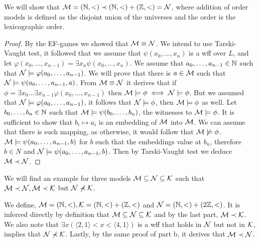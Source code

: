 \subquestion{}
We will show that $\mathcal{M} = (\mathbb{N}, <) \prec (\mathbb{N}, <) + (\mathbb{Z}, <) = \mathcal{N}$, where addition of order models is defined as the disjoint union of the universes and the order is the lexicographic order.
\begin{proof}
	By the EF-games we showed that $\mathcal{M} \equiv \mathcal{N}$.
	We intend to use Tarski-Vaught test, it followed that we assume that $\psi(x_0, \dots, x_n)$ is a wff over $L$,
	and let $\varphi(x_0, \dots, x_{n - 1}) = \exists x_n \psi(x_0, \dots, x_n)$.
	We assume that $a_0, \dots, a_{n - 1} \in \mathbb{N}$ such that $\mathcal{N} \models \varphi(a_0, \dots, a_{n - 1})$.
	We will prove that there is $a \in \mathcal{M}$ such that $\mathcal{N} \models \psi(a_0, \dots, a_{n - 1}, a)$.
	From $\mathcal{M} \equiv \mathcal{N}$ it derives that if $\phi = \exists x_0 \dots \exists x_{n - 1} \varphi(x_0, \dots, x_{n - 1})$ then $\mathcal{M} \models \phi \iff \mathcal{N} \models \phi$.
	But we assumed that $\mathcal{N} \models \varphi(a_0, \dots, a_{n - 1})$, it follows that $\mathcal{N} \models \phi$, then $\mathcal{M} \models \phi$ as well.
	Let $b_0, \dots, b_n \in \mathbb{N}$ such that $\mathcal{M} \models \psi(b_0, \dots, b_n)$, the witnesses to $\mathcal{M} \models \phi$.
	It is sufficient to show that $b_i \mapsto a_i$ is an embedding of $\mathcal{M}$ into $\mathcal{M}$.
	We can assume that there is such mapping, as otherwise, it would follow that $\mathcal{M} \not\models \phi$.
	$\mathcal{M} \models \psi(a_0, \dots, a_{n - 1}, b)$ for $b$ such that the embeddings value at $b_n$, therefore $b \in N$ and $\mathcal{N} \models \psi(a_0, \dots, a_{n - 1}, b)$.
	Then by Tarski-Vaught test we deduce $\mathcal{M} \prec \mathcal{N}$.
\end{proof}

\subquestion{}
We will find an example for three models $\mathcal{M} \subseteq \mathcal{N} \subseteq \mathcal{K}$ such that $\mathcal{M} \prec \mathcal{N}, \mathcal{M} \prec \mathcal{K}$ but $\mathcal{N} \not\prec \mathcal{K}$.
\begin{solution}
	We define, $\mathcal{M} = (\mathbb{N}, <), \mathcal{K} = (\mathbb{N}, <) + (\mathbb{Z}, <)$ and $\mathcal{N} = (\mathbb{N}, <) + (2\mathbb{Z}, <)$.
	It is inferred directly by definition that $\mathcal{M} \subseteq \mathcal{N} \subseteq \mathcal{K}$ and by the last part, $\mathcal{M} \prec \mathcal{K}$.
	We also note that $\exists x (\langle 2, 1\rangle < x < \langle 4, 1 \rangle)$ is a wff that holds in $\mathcal{N}$ but not in $\mathcal{K}$, implies that $\mathcal{N} \not\prec \mathcal{K}$.
	Lastly, by the same proof of part b, it derives that $\mathcal{M} \prec \mathcal{N}$.
\end{solution}

